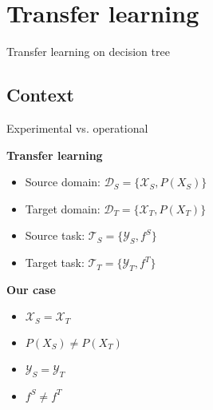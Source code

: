 \section{Transfer learning}

\begin{frame}{}
    \centering
    \vspace{3cm}
    \Huge
    \textcolor{myblue}{Transfer learning on decision tree}
\end{frame}

\subsection{Context}

\begin{frame}{Experimental vs. operational}
\begin{minipage}[t]{0.49\linewidth}
    \vspace{0pt}
    \textbf{Transfer learning}
    \begin{itemize}
        \item Source domain: $\mathcal{D}_{S} = \{\mathcal{X}_{S}, P(X_{S})\}$\\
        \item Target domain: $\mathcal{D}_{T} = \{\mathcal{X}_{T}, P(X_{T})\}$\\
        \item Source task: $\mathcal{T}_{S} = \{\mathcal{Y}_{S}, f^S\}$\\
        \item Target task: $\mathcal{T}_{T} = \{\mathcal{Y}_{T}, f^T\}$\\
    \end{itemize}
\end{minipage}
\begin{minipage}[t]{0.49\linewidth}
    \vspace{0pt}
    \textbf{Our case}
    \begin{itemize}%
        \item $\mathcal{X}_{S} = \mathcal{X}_{T}$
        \item \textcolor{myorange}{$P(X_{S}) \neq P(X_{T})$}
        \item $\mathcal{Y}_{S} = \mathcal{Y}_{T}$
        \item \textcolor{myorange}{$f^S \neq f^T$}
    \end{itemize}
\end{minipage}

\bigskip


\end{frame}

